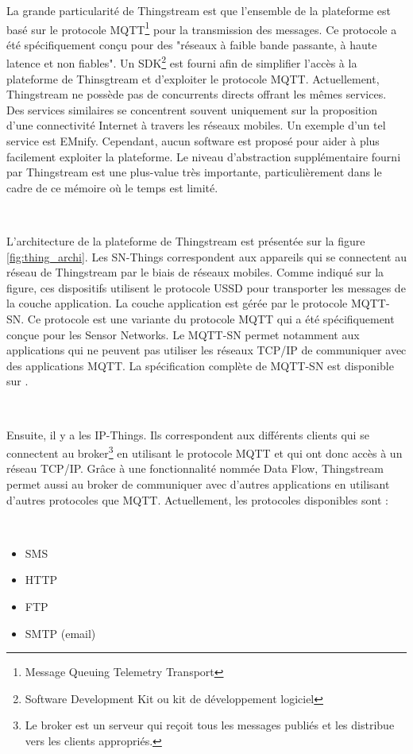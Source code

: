 \noindent
La grande particularité de Thingstream est que l'ensemble de la plateforme est basé sur le protocole MQTT\footnote{Message Queuing Telemetry Transport} pour la transmission des messages. Ce protocole a été spécifiquement conçu pour des "réseaux à faible bande passante, à haute latence et non fiables"\cite{mqtt_faq}. Un SDK\footnote{Software Development Kit ou kit de développement logiciel} est fourni afin de simplifier l'accès à la plateforme de Thinsgtream et d'exploiter le protocole MQTT. Actuellement, Thingstream ne possède pas de concurrents directs offrant les mêmes services. Des services similaires se concentrent souvent uniquement sur la proposition d'une connectivité Internet à travers les réseaux mobiles. Un exemple d'un tel service est EMnify. Cependant, aucun software est proposé pour aider à plus facilement exploiter la plateforme. Le niveau d'abstraction supplémentaire fourni par Thingstream est une plus-value très importante, particulièrement dans le cadre de ce mémoire où le temps est limité.

~

\noindent
L'architecture de la plateforme de Thingstream est présentée sur la figure \ref{fig:thing_archi}. Les SN-Things correspondent aux appareils qui se connectent au réseau de Thingstream par le biais de réseaux mobiles. Comme indiqué sur la figure, ces dispositifs utilisent le protocole USSD pour transporter les messages de la couche application. La couche application est gérée par le protocole MQTT-SN. Ce protocole est une variante du protocole MQTT qui a été spécifiquement conçue pour les Sensor Networks. Le MQTT-SN permet notamment aux applications qui ne peuvent pas utiliser les réseaux TCP/IP de communiquer avec des applications MQTT. La spécification complète de MQTT-SN est disponible sur \cite{stanford2013mqtt}.


~

\noindent
Ensuite, il y a les IP-Things. Ils correspondent aux différents clients qui se connectent au broker\footnote{Le broker est un serveur qui reçoit tous les messages publiés et les distribue vers les clients appropriés.} en utilisant le protocole MQTT et qui ont donc accès à un réseau TCP/IP. Grâce à une fonctionnalité nommée Data Flow, Thingstream permet aussi au broker de communiquer avec d'autres applications en utilisant d'autres protocoles que MQTT. Actuellement, les protocoles disponibles sont :

~

\begin{itemize}
  \item SMS
  \item HTTP
  \item FTP
  \item SMTP (email)
\end{itemize}

